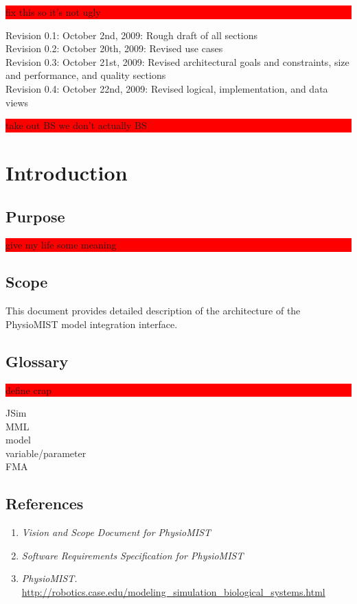 \documentclass{article}
\title{\todo{PhysioMIST Design Crap}}
\author{Mark Caral, Sara Cummins, BarbaraJoy Jones, Joshua Lee}
\date{October 23, 2009\\{\sc Eecs} 393}
\newcommand{\todo}[1]{\colorbox{red}{\begin{minipage}{\textwidth}{#1}\end{minipage}}}
\begin{document}
\begin{titlepage}
\maketitle\thispagestyle{empty}
\end{titlepage}

\todo{fix this so it's not ugly}
Revision 0.1: October 2nd, 2009: Rough draft of all sections\\
Revision 0.2: October 20th, 2009: Revised use cases\\
Revision 0.3: October 21st, 2009: Revised architectural goals and constraints, size and performance, and quality sections\\
Revision 0.4: October 22nd, 2009: Revised logical, implementation, and data views\\

\newpage

\tableofcontents
\newpage

\todo{take out BS we don't actually BS}

\section{Introduction}
\subsection{Purpose}
\todo{give my life some meaning}
\subsection{Scope}
This document provides detailed description of the architecture of the PhysioMIST model integration interface.
\subsection{Glossary}
\todo{define crap}
JSim\\
MML\\
model\\
variable/parameter\\
FMA
\subsection{References}
\begin{enumerate}
\item \emph{Vision and Scope Document for PhysioMIST}
\item \emph{Software Requirements Specification for PhysioMIST}
\item \emph{PhysioMIST.} \url{http://robotics.case.edu/modeling_simulation_biological_systems.html}
\end{enumerate}
\end{document}
